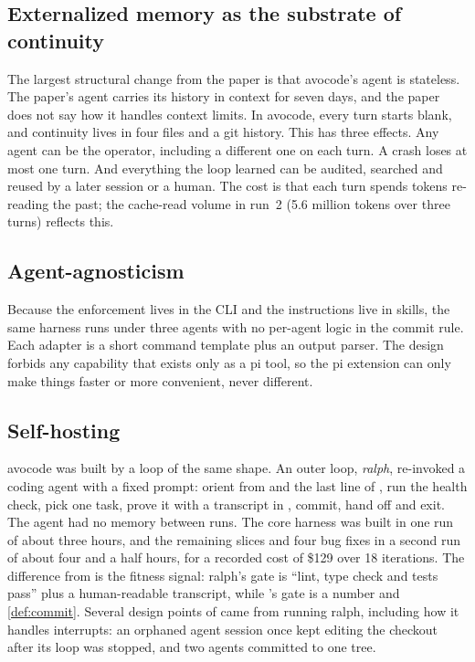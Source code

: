 \subsection{Externalized memory as the substrate of continuity}

The largest structural change from the paper is that avocode's agent is stateless. The paper's agent
carries its history in context for seven days, and the paper does not say how it handles context
limits. In avocode, every turn starts blank, and continuity lives in four files and a git history.
This has three effects. Any agent can be the operator, including a different one on each turn. A
crash loses at most one turn. And everything the loop learned can be audited, searched and reused by
a later session or a human. The cost is that each turn spends tokens re-reading the past; the
cache-read volume in run~2 (5.6 million tokens over three turns) reflects this.

\subsection{Agent-agnosticism}

Because the enforcement lives in the CLI and the instructions live in skills, the same harness runs
under three agents with no per-agent logic in the commit rule. Each adapter is a short command
template plus an output parser. The design forbids any capability that exists only as a pi tool, so the pi
extension can only make things faster or more convenient, never different.

\subsection{Self-hosting}

avocode was built by a loop of the same shape. An outer loop, \emph{ralph}, re-invoked a coding agent
with a fixed prompt: orient from  and the last line of , run the
health check, pick one task, prove it with a transcript in , commit, hand off and
exit. The agent had no memory between runs. The core harness was built in one run of about three
hours, and the remaining slices and four bug fixes in a second run of about four and a half hours,
for a recorded cost of \$129 over 18 iterations. The difference from  is the fitness signal:
ralph's gate is ``lint, type check and tests pass'' plus a human-readable transcript, while 's
gate is a number and \cref{def:commit}. Several design points of  came from running ralph,
including how it handles interrupts: an orphaned agent session once kept editing the checkout after
its loop was stopped, and two agents committed to one tree.
